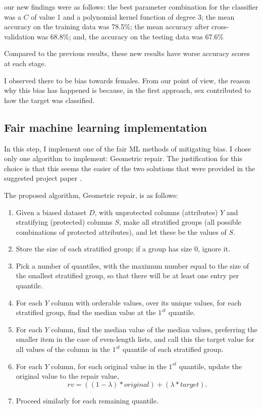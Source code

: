 \documentclass[conference]{IEEEtran}
\begin{document}
our new findings were as follows: the best parameter combination for the classifier was a $C$ of value 1 and a polynomial kernel function of degree 3; the mean accuracy on the training data was 78.5\%; the mean accuracy after cross-validation was 68.8\%; and, the accuracy on the testing data was 67.6\%

Compared to the previous results, these new results have worse accuracy scores at each stage.

I observed there to be bias towards females. From our point of view, the reason why this bias has happened is because, in the first approach, sex contributed to how the target was classified.

\subsection{Fair machine learning implementation}
In this step, I implement one of the fair ML methods of mitigating bias. I chose only one algorithm to implement: Geometric repair. The justification for this choice is that this seems the easier of the two solutions that were provided in the suggested project paper \cite{Feldman2015ComputationalFP}.

The proposed algorithm, Geometric repair, is as follows:
\begin{enumerate}
    \item Given a biased dataset $D$, with unprotected columns (attributes) $Y$ and stratifying (protected) columns $S$, make all stratified groups (all possible combinations of protected attributes), and let these be the values of $S$.
    \item Store the size of each stratified group; if a group has size 0, ignore it.
    \item Pick a number of quantiles, with the maximum number equal to the size of the smallest stratified group, so that there will be at least one entry per quantile. 
    \item For each $Y$ column with orderable values, over its unique values, for each stratified group, find the median value at the $1^{st}$ quantile.
    \item For each $Y$ column, find the median value of the median values, preferring the smaller item in the case of even-length lists, and call this the target value for all values of the column in the $1^{st}$ quantile of each stratified group.
    \item For each $Y$ column, for each original value in the $1^{st}$ quantile, update the original value to the repair value, $$rv = ((1 - \lambda) * original) + (\lambda * target).$$
    \item Proceed similarly for each remaining quantile.     
\end{enumerate}
\end{document}
